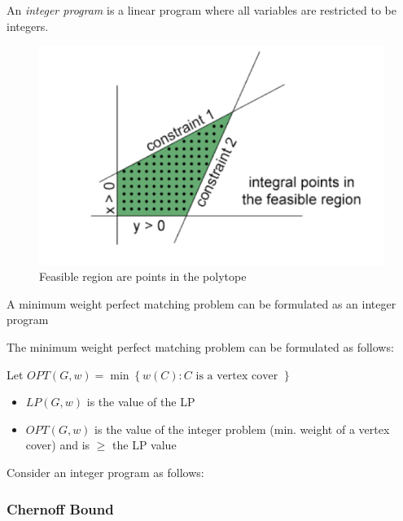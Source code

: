 \documentclass[../notes.tex]{subfiles}
\begin{document}
\begin{definition}
    An \textit{integer program} is a linear program where all variables are restricted to be integers.

    \begin{figure}[H]
        \centering
        \includegraphics[width=0.8\linewidth]{img/image_2023-03-31-12-33-41.png}
        \caption{Feasible region are points in the polytope}
    \end{figure}

\end{definition}




A minimum weight perfect matching problem can be formulated as an integer program




The minimum weight perfect matching problem can be formulated as follows:


Let $ OPT(G, w) = \min \left\{  w(C): C \text{ is a vertex cover } \right\}  $



\begin{itemize}
    \item $ LP(G, w) $ is the value of the LP
    \item $ OPT(G, w) $ is the value of the integer problem (min. weight of a vertex cover) and is $ \ge  $ the LP value
\end{itemize}




Consider an integer program as follows:




\subsubsection{Chernoff Bound}
\end{document}
